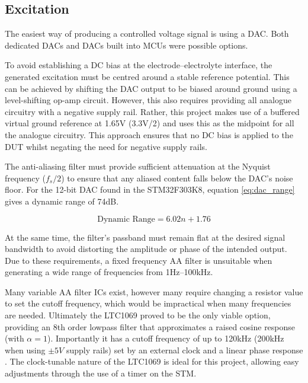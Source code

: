 
\subsection{Excitation}\label{subsec:design_excitation}
The easiest way of producing a controlled voltage signal is using a \ac{DAC}. Both dedicated \acp{DAC} and \acp{DAC} built into \acp{MCU} were possible options.

To avoid establishing a DC bias at the electrode–electrolyte interface, the generated excitation must be centred around a stable reference potential. This can be achieved by shifting the DAC output to be biased around ground using a level-shifting op-amp circuit. However, this also requires providing all analogue circuitry with a negative supply rail. Rather, this project makes use of a buffered virtual ground reference at 1.65V (3.3V/2) and uses this as the midpoint for all the analogue circuitry. This approach ensures that no DC bias is applied to the \ac{DUT} whilst negating the need for negative supply rails.

The anti-aliasing filter must provide sufficient attenuation at the Nyquist frequency ($f_s/2$) to ensure that any aliased content falls below the DAC's noise floor. For the 12-bit \ac{DAC} found in the STM32F303K8, equation \ref{eq:dac_range} gives a dynamic range of 74dB. 

\begin{equation}
    \text{Dynamic Range}=6.02n + 1.76 
    \label{eq:dac_range}
\end{equation}

At the same time, the filter's passband must remain flat at the desired signal bandwidth to avoid distorting the amplitude or phase of the intended output. Due to these requirements, a fixed frequency AA filter is unsuitable when generating a wide range of frequencies from 1Hz--100kHz.

Many variable AA filter ICs exist, however many require changing a resistor value to set the cutoff frequency, which would be impractical when many frequencies are needed. Ultimately the LTC1069 proved to be the only viable option, providing an 8th order lowpass filter that approximates a raised cosine response (with $\alpha=1$). Importantly it has a cutoff frequency of up to 120kHz (200kHz when using $\pm5V$ supply rails) set by an external clock and a linear phase response \cite{LTC10697CS8PBF}. The clock-tunable nature of the LTC1069 is ideal for this project, allowing easy adjustments through the use of a timer on the STM.

